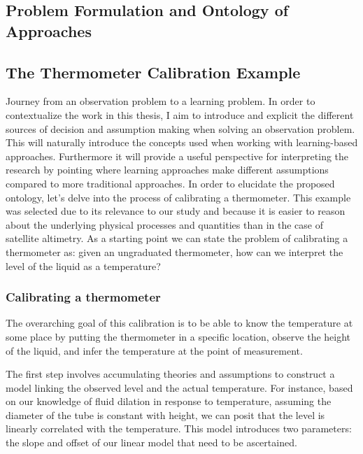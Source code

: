 \begin{bibunit}

\clearemptydoublepage
\chapter{Problem Formulation and Ontology of Approaches}
\label{chap:1}


\section{The Thermometer Calibration Example}

Journey from an observation problem to a learning problem.
In order to contextualize the work in this thesis, I aim to introduce and explicit the different sources of decision and assumption making when solving an observation problem. This will naturally introduce the concepts used when working with learning-based approaches. Furthermore it will provide a useful perspective for interpreting the research by pointing where learning approaches make different assumptions compared to more traditional approaches.
In order to elucidate the proposed ontology, let's delve into the process of calibrating a thermometer. This example was selected due to its relevance to our study and because it is easier to reason about the underlying physical processes and quantities than in the case of satellite altimetry. As a starting point we can state the problem of calibrating a thermometer as: given an ungraduated thermometer, how can we interpret the level of the liquid as a temperature?

\subsection{Calibrating a thermometer}

The overarching goal of this calibration is to be able to know the temperature at some place by putting the thermometer in a specific location, observe the height of the liquid, and infer the temperature at the point of measurement.

The first step involves accumulating theories and assumptions to construct a model linking the observed level and the actual temperature. For instance, based on our knowledge of fluid dilation in response to temperature, assuming the diameter of the tube is constant with height, we can posit that the level is linearly correlated with the temperature. This model introduces two parameters: the slope and offset of our linear model that need to be ascertained.


\end{bibunit}
